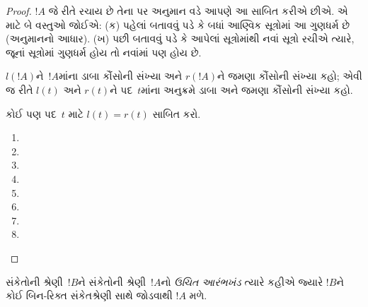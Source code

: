 \begin{proof}
$!A$ જે રીતે રચાય છે તેના પર અનુમાન વડે આપણે આ સાબિત કરીએ છીએ.
એ માટે બે વસ્તુઓ જોઈએ: (ક) પહેલાં બતાવવું પડે કે બધાં આણ્વિક સૂત્રોમાં
આ ગુણધર્મ છે (અનુમાનનો આધાર). (ખ) પછી બતાવવું પડે કે આપેલાં
સૂત્રોમાંથી નવાં સૂત્રો રચીએ ત્યારે, જૂનાં સૂત્રોમાં ગુણધર્મ હોય તો
નવાંમાં પણ હોય છે.

$l(!A)$ને~$!A$માંના ડાબા કૌંસોની સંખ્યા અને $r(!A)$ને જમણા
કૌંસોની સંખ્યા કહો; એવી જ રીતે $l(t)$ અને $r(t)$ને પદ~$t$માંના
અનુક્રમે ડાબા અને જમણા કૌંસોની સંખ્યા કહો.

\begin{prob}
    કોઈ પણ પદ~$t$ માટે $l(t)=r(t)$ સાબિત કરો.
\end{prob}

\begin{enumerate}
\item {}

\item {}

\item {}

\item {}

\item {}

\item {}

\item {}



\item {}
\end{enumerate}
\end{proof}

\begin{defn}[ઉચિત આરંભખંડ]
સંકેતોની શ્રેણી~$!B$ને સંકેતોની શ્રેણી~$!A$નો \emph{ઉચિત આરંભખંડ}
ત્યારે કહીએ જ્યારે $!B$ને કોઈ બિન-રિક્ત સંકેતશ્રેણી સાથે જોડવાથી
$!A$ મળે.
\end{defn}

